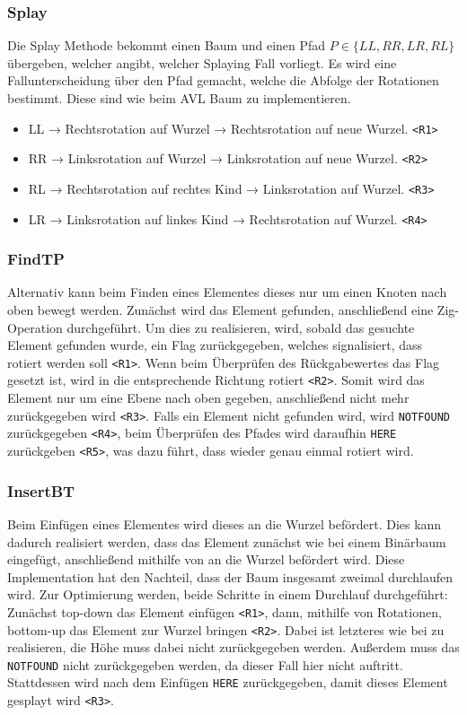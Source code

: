 \subsubsection{Splay}\label{par:splay}
Die Splay Methode bekommt einen Baum und einen Pfad \(P \in \{LL, RR, LR, RL\}\) übergeben,
welcher angibt, welcher Splaying Fall vorliegt.
Es wird eine Fallunterscheidung über den Pfad gemacht, welche die Abfolge der Rotationen bestimmt.
Diese sind wie beim AVL Baum zu implementieren.
\begin{itemize}
    \item LL → Rechtsrotation auf Wurzel → Rechtsrotation auf neue Wurzel. \verb|<R1>|
    \item RR → Linksrotation auf Wurzel → Linksrotation auf neue Wurzel. \verb|<R2>|
    \item RL → Rechtsrotation auf rechtes Kind → Linksrotation auf Wurzel. \verb|<R3>|
    \item LR → Linksrotation auf linkes Kind → Rechtsrotation auf Wurzel. \verb|<R4>|
\end{itemize}

\subsubsection{FindTP}
Alternativ kann beim Finden eines Elementes dieses nur um einen Knoten nach oben bewegt werden.
Zunächst wird das Element gefunden, anschließend eine Zig-Operation durchgeführt.
Um dies zu realisieren, wird, sobald das gesuchte Element gefunden wurde, ein Flag zurückgegeben,
welches signalisiert, dass rotiert werden soll \verb|<R1>|.
Wenn beim Überprüfen des Rückgabewertes das Flag gesetzt ist, wird in die entsprechende Richtung
rotiert \verb|<R2>|.
Somit wird das Element nur um eine Ebene nach oben gegeben, anschließend nicht mehr zurückgegeben
wird \verb|<R3>|.
Falls ein Element nicht gefunden wird, wird \verb|NOTFOUND| zurückgegeben \verb|<R4>|, beim
Überprüfen des Pfades wird daraufhin \verb|HERE| zurückgeben \verb|<R5>|, was dazu führt, dass
wieder genau einmal rotiert wird.

\subsubsection{InsertBT}
Beim Einfügen eines Elementes wird dieses an die Wurzel befördert.
Dies kann dadurch realisiert werden, dass das Element zunächst wie bei einem Binärbaum
eingefügt, anschließend mithilfe von  an die Wurzel befördert wird.
Diese Implementation hat den Nachteil, dass der Baum insgesamt zweimal durchlaufen wird.
Zur Optimierung werden, beide Schritte in einem Durchlauf durchgeführt: Zunächst top-down
das Element einfügen \verb|<R1>|, dann, mithilfe von Rotationen, bottom-up das Element zur Wurzel
bringen \verb|<R2>|.
Dabei ist letzteres wie bei  zu realisieren,
die Höhe muss dabei nicht zurückgegeben werden.
Außerdem muss das \verb|NOTFOUND| nicht zurückgegeben werden, da dieser Fall hier nicht auftritt.
Stattdessen wird nach dem Einfügen \verb|HERE| zurückgegeben, damit dieses Element gesplayt wird
\verb|<R3>|.


